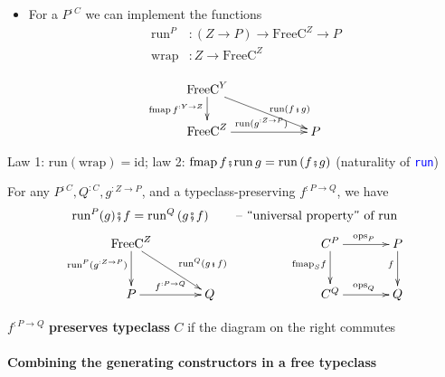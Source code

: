 {\footnotesize{}\vspace{-0.45cm}}%
\begin{minipage}[t]{0.64\columnwidth}%
\begin{itemize}
\item For a $P^{:C}$ we can implement the functions {\footnotesize{}
\begin{align*}
\text{run}^{P} & :\left(Z\rightarrow P\right)\rightarrow\text{FreeC}^{Z}\rightarrow P\\
\text{wrap} & :Z\rightarrow\text{FreeC}^{Z}
\end{align*}
}
\end{itemize}
%
\end{minipage}{\footnotesize{}}%
\begin{minipage}[t]{0.36\columnwidth}%
{\footnotesize{}
\[
\xymatrix{\xyScaleY{1.5pc}\xyScaleX{5pc}\text{FreeC}^{Y}\ar[d]\sb(0.45){\text{fmap}\,f^{:Y\rightarrow Z}}\ar[rd]\sp(0.65){\ \text{run}\left(f\bef g\right)}\\
\text{FreeC}^{Z}\ar[r]\sp(0.5){\text{run}(g^{:Z\rightarrow P})} & P
}
\]
}%
\end{minipage}\hfill{}

Law 1: {\footnotesize{}$\text{run}\left(\text{wrap}\right)=\text{id}$};
law 2: {\footnotesize{}$\text{fmap}\,f\bef\text{run}\,g=\text{run}\left(f\bef g\right)$}
(naturality of \texttt{\textcolor{blue}{\footnotesize{}run}})

For any $P^{:C},Q^{:C},g^{:Z\rightarrow P}$, and a typeclass-preserving
$f^{:P\rightarrow Q}$, we have{\footnotesize{}
\[
\text{run}^{P}(g)\bef f=\text{run}^{Q}\left(g\bef f\right)\quad\quad\text{– \textsf{``}universal property\textsf{''} of }\text{run}
\]
\[
\xymatrix{\xyScaleY{2.0pc}\xyScaleX{3pc}\text{FreeC}^{Z}\ar[d]\sb(0.4){\text{run}^{P}(g^{:Z\rightarrow P})}\ar[rd]\sp(0.55){\quad\text{run}^{Q}(g\bef f)} &  &  & C^{P}\ar[d]\sb(0.4){\text{fmap}_{S}f}\ar[r]\sp(0.5){\text{ops}_{P}} & P\ar[d]\sb(0.4){f}\\
P\ar[r]\sp(0.5){f^{:P\rightarrow Q}} & Q &  & C^{Q}\ar[r]\sp(0.5){\text{ops}_{Q}} & Q
}
\]
}{\footnotesize\par}

$f^{:P\rightarrow Q}$ \textbf{preserves typeclass} $C$ if the diagram
on the right commutes


\paragraph{Combining the generating constructors in a free typeclass}

